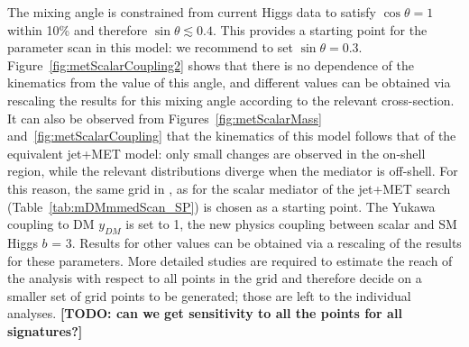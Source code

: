 The mixing angle  is constrained from current Higgs data
to satisfy $\cos\theta = 1$ within 10\% and therefore $\sin\theta \lesssim 0.4$. This provides a starting point 
for the parameter scan in this model: we recommend to set $\sin\theta = 0.3$. 
Figure~\ref{fig:metScalarCoupling2} shows that
there is no dependence of the kinematics from the value of this angle, and different values can be obtained via rescaling
the results for this mixing angle according to the relevant cross-section. It can also be observed from Figures~\ref{fig:metScalarMass} and~\ref{fig:metScalarCoupling} 
that the kinematics of this model follows that of the equivalent jet+MET model: only small changes are observed
in the on-shell region, while the relevant distributions diverge when the mediator is off-shell. 
For this reason, the same grid in \mmed, \mdm as for the scalar mediator
of the jet+MET search (Table~\ref{tab:mDMmmedScan_SP}) is chosen as a starting point. 
The Yukawa coupling to DM $y_{DM}$ is set to 1, the 
new physics coupling between scalar and SM Higgs $b$ = 3. Results for other values can be obtained via a 
rescaling of the results for these parameters. 
More detailed studies are required to estimate the reach of the analysis with respect to all points in the grid
and therefore decide on a smaller set of grid points to be generated; 
those are left to the individual analyses. \textbf{[TODO: can we get sensitivity to all the points for all signatures?]}

